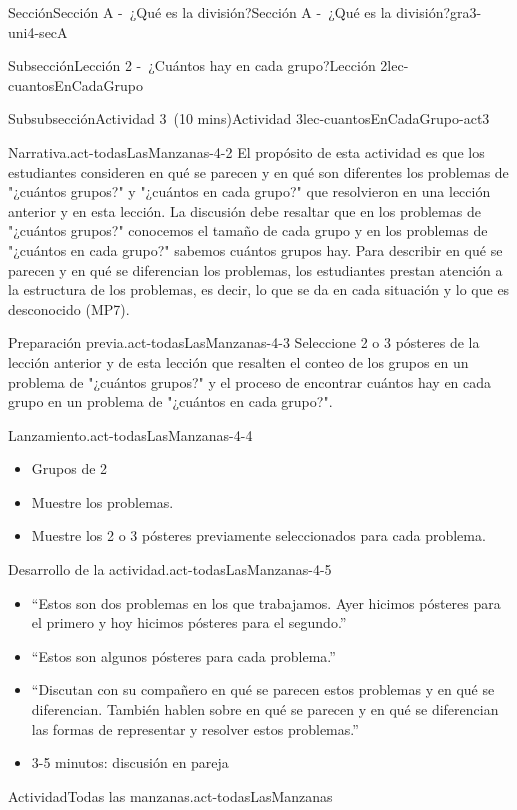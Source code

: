 \documentclass[oneside,10pt,]{article}
\begin{document}
\begin{sectionptx}{Sección}{Sección A -~¿Qué es la división?}{}{Sección A -~¿Qué es la división?}{}{}{gra3-uni4-secA}
\begin{subsectionptx}{Subsección}{Lección 2 -~¿Cuántos hay en cada grupo?}{}{Lección 2}{}{}{lec-cuantosEnCadaGrupo}
\begin{subsubsectionptx}{Subsubsección}{Actividad 3~(10 mins)}{}{Actividad 3}{}{}{lec-cuantosEnCadaGrupo-act3}
\begin{paragraphs}{Narrativa.}{act-todasLasManzanas-4-2}
El propósito de esta actividad es que los estudiantes consideren en qué se parecen y en qué son diferentes los problemas de "¿cuántos grupos?" y "¿cuántos en cada grupo?" que resolvieron en una lección anterior y en esta lección. La discusión debe resaltar que en los problemas de "¿cuántos grupos?" conocemos el tamaño de cada grupo y en los problemas de "¿cuántos en cada grupo?" sabemos cuántos grupos hay. Para describir en qué se parecen y en qué se diferencian los problemas, los estudiantes prestan atención a la estructura de los problemas, es decir, lo que se da en cada situación y lo que es desconocido (MP7).%
\end{paragraphs}%
\begin{paragraphs}{Preparación previa.}{act-todasLasManzanas-4-3}%
Seleccione 2 o 3 pósteres de la lección anterior y de esta lección que resalten el conteo de los grupos en un problema de "¿cuántos grupos?" y el proceso de encontrar cuántos hay en cada grupo en un problema de "¿cuántos en cada grupo?".%
\end{paragraphs}%
\begin{paragraphs}{Lanzamiento.}{act-todasLasManzanas-4-4}%
%
\begin{itemize}[label=\textbullet]
\item{}Grupos de 2%
\item{}Muestre los problemas.%
\item{}Muestre los 2 o 3 pósteres previamente seleccionados para cada problema.%
\end{itemize}
\end{paragraphs}%
\begin{paragraphs}{Desarrollo de la actividad.}{act-todasLasManzanas-4-5}%
%
\begin{itemize}[label=\textbullet]
\item{}``Estos son dos problemas en los que trabajamos. Ayer hicimos pósteres para el primero y hoy hicimos pósteres para el segundo.''%
\item{}``Estos son algunos pósteres para cada problema.''%
\item{}``Discutan con su compañero en qué se parecen estos problemas y en qué se diferencian. También hablen sobre en qué se parecen y en qué se diferencian las formas de representar y resolver estos problemas.''%
\item{}3-5 minutos: discusión en pareja%
\end{itemize}
\end{paragraphs}%
\begin{activity}{Actividad}{Todas las manzanas.}{act-todasLasManzanas}%

\end{activity}
\end{subsubsectionptx}
\end{subsectionptx}
\end{sectionptx}
\end{document}
